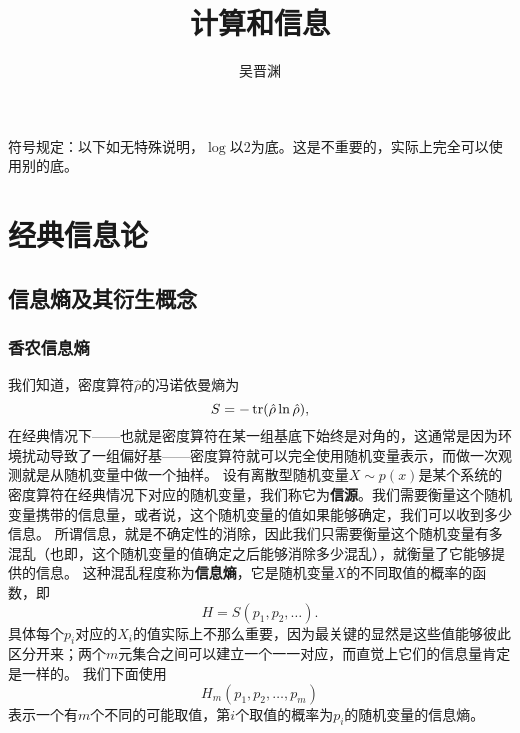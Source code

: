 \documentclass[UTF8, a4paper]{ctexart}
\title{计算和信息}
\author{吴晋渊}
\begin{document}
\maketitle

符号规定：以下如无特殊说明，$\log$以$2$为底。这是不重要的，实际上完全可以使用别的底。

\section{经典信息论}

\subsection{信息熵及其衍生概念}

\subsubsection{香农信息熵}

我们知道，密度算符$\hat{\rho}$的冯诺依曼熵为
\begin{equation}
    S = - \trace (\hat{\rho} \ln \hat{\rho}),
\end{equation}
在经典情况下——也就是密度算符在某一组基底下始终是对角的，这通常是因为环境扰动导致了一组偏好基——密度算符就可以完全使用随机变量表示，而做一次观测就是从随机变量中做一个抽样。
设有离散型随机变量$X \sim p(x)$是某个系统的密度算符在经典情况下对应的随机变量，我们称它为\textbf{信源}。我们需要衡量这个随机变量携带的信息量，或者说，这个随机变量的值如果能够确定，我们可以收到多少信息。
所谓信息，就是不确定性的消除，因此我们只需要衡量这个随机变量有多混乱（也即，这个随机变量的值确定之后能够消除多少混乱），就衡量了它能够提供的信息。
这种混乱程度称为\textbf{信息熵}，它是随机变量$X$的不同取值的概率的函数，即
\[
    H = S(p_1, p_2, \ldots).
\]
具体每个$p_i$对应的$X_i$的值实际上不那么重要，因为最关键的显然是这些值能够彼此区分开来；两个$m$元集合之间可以建立一个一一对应，而直觉上它们的信息量肯定是一样的。
我们下面使用
\[
    H_m (p_1, p_2, \ldots, p_m)
\]
表示一个有$m$个不同的可能取值，第$i$个取值的概率为$p_i$的随机变量的信息熵。
\end{document}
